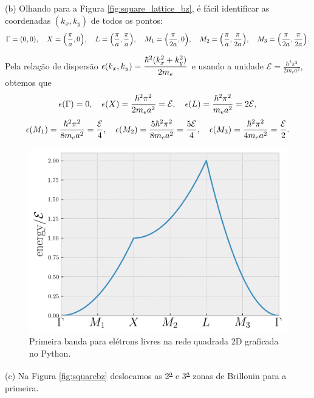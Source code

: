 \documentclass[a4paper,10pt]{article}
\begin{document}
\n

(b) Olhando para a Figura \ref{fig:square_lattice_bz}, é fácil identificar as coordenadas $(k_x, k_y)$ de todos os pontos:
$$
\Gamma = \qty(0, 0), \quad
X = \qty(\frac{\pi}{a}, 0), \quad
L = \qty(\frac{\pi}{a}, \frac{\pi}{a}), \quad
M_1 = \qty(\frac{\pi}{2a}, 0), \quad
M_2 = \qty(\frac{\pi}{a}, \frac{\pi}{2a}), \quad
M_3 = \qty(\frac{\pi}{2a}, \frac{\pi}{2a}).
$$

Pela relação de dispersão $\displaystyle{\epsilon(k_x, k_y) = \frac{\hbar^2 (k_x^2 + k_y^2)}{2m_e}}$ e usando a unidade $\displaystyle{\mathcal{E} = \frac{\hbar^2 \pi^2}{2 m_e a^2}}$, obtemos que
$$
\epsilon(\Gamma) = 0, \quad
\epsilon(X) = \frac{\hbar^2 \pi^2}{2 m_e a^2} = \mathcal{E}, \quad
\epsilon(L) = \frac{\hbar^2 \pi^2}{m_e a^2} = 2 \mathcal{E},
$$
$$
\epsilon(M_1) = \frac{\hbar^2 \pi^2}{8 m_e a^2} = \frac{\mathcal{E}}{4}, \quad
\epsilon(M_2) = \frac{5\hbar^2 \pi^2}{8 m_e a^2} = \frac{5\mathcal{E}}{4}, \quad
\epsilon(M_3) = \frac{\hbar^2 \pi^2}{4 m_e a^2} = \frac{\mathcal{E}}{2}.
$$

\begin{figure}[H]
\centering
\includegraphics[width=0.5\linewidth]{fig/band_struct_square_free.png}
\caption{Primeira banda para elétrons livres na rede quadrada 2D graficada no Python.}
\label{fig:band_struct_square_free}
\end{figure}

(c) Na Figura \ref{fig:squarebz} deslocamos as 2\textsuperscript{\underline{a}} e 3\textsuperscript{\underline{a}} zonas de Brillouin para a primeira.
\end{document}
